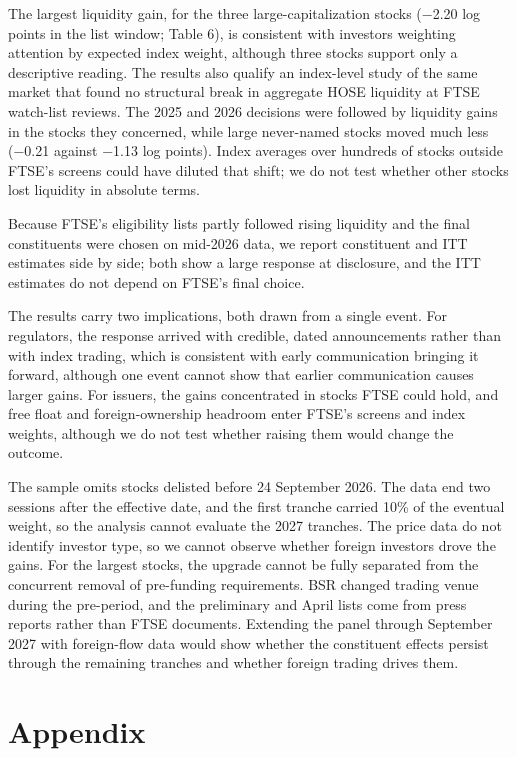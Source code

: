 \documentclass[review,authoryear,12pt]{elsarticle}
\begin{document}
The largest liquidity gain, for the three large-capitalization stocks
(−2.20 log points in the list window; Table 6), is consistent with
investors weighting attention by expected index weight, although three
stocks support only a descriptive reading. The results also qualify an
index-level study of the same market that found no structural break in
aggregate HOSE liquidity at FTSE watch-list reviews. The 2025 and 2026
decisions were followed by liquidity gains in the stocks they concerned,
while large never-named stocks moved much less (−0.21 against −1.13 log
points). Index averages over hundreds of stocks outside FTSE's screens
could have diluted that shift; we do not test whether other stocks lost
liquidity in absolute terms.

Because FTSE's eligibility lists partly followed rising liquidity and
the final constituents were chosen on mid-2026 data, we report
constituent and ITT estimates side by side; both show a large response
at disclosure, and the ITT estimates do not depend on FTSE's final
choice.

The results carry two implications, both drawn from a single event. For
regulators, the response arrived with credible, dated announcements
rather than with index trading, which is consistent with early
communication bringing it forward, although one event cannot show that
earlier communication causes larger gains. For issuers, the gains
concentrated in stocks FTSE could hold, and free float and
foreign-ownership headroom enter FTSE's screens and index weights,
although we do not test whether raising them would change the outcome.

The sample omits stocks delisted before 24 September 2026. The data end
two sessions after the effective date, and the first tranche carried
10\% of the eventual weight, so the analysis cannot evaluate the 2027
tranches. The price data do not identify investor type, so we cannot
observe whether foreign investors drove the gains. For the largest
stocks, the upgrade cannot be fully separated from the concurrent
removal of pre-funding requirements. BSR changed trading venue during
the pre-period, and the preliminary and April lists come from press
reports rather than FTSE documents. Extending the panel through
September 2027 with foreign-flow data would show whether the constituent
effects persist through the remaining tranches and whether foreign
trading drives them.

\hypertarget{appendix}{%
\section*{Appendix}}
\end{document}
